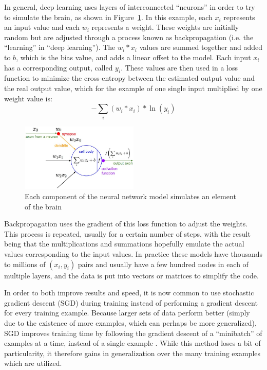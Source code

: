 \documentclass[]{report}
\begin{document}
In general, deep learning uses layers of interconnected ``neurons'' in order to try to simulate the brain, as shown in Figure~\ref{neural-model}. In this example, each $x_{i}$ represents an input value and each $w_{i}$ represents a weight. These weights are initially random but are adjusted through a process known as backpropagation (i.e. the ``learning'' in ``deep learning''). The $w_{i}*x_{i}$ values are summed together and added to $b$, which is the bias value, and adds a linear offset to the model. Each input $x_{i}$ has a corresponding output, called $y_{i}$. These values are then used in a loss function to minimize the cross-entropy between the estimated output value and the real output value, which for the example of one single input multiplied by one weight value is: $$-\sum_{i} (w_{i}*x_{i})*\ln(y_{i}) $$
\begin{figure}
	\centering
	\includegraphics[width=0.5\textwidth]{../images/neuron_model}
	\caption{Each component of the neural network model simulates an element of the brain \cite{karpathy}}
	\label{neural-model}
\end{figure}

Backpropagation uses the gradient of this loss function to adjust the weights. This process is repeated, usually for a certain number of steps, with the result being that the multiplications and summations hopefully emulate the actual values corresponding to the input values. In practice these models have thousands to millions of $(x_{i}, y_{i})$ pairs and usually have a few hundred nodes in each of multiple layers, and the data is put into vectors or matrices to simplify the code. 

In order to both improve results and speed, it is now common to use stochastic gradient descent (SGD) during training instead of performing a gradient descent for every training example. Because larger sets of data perform better (simply due to the existence of more examples, which can perhaps be more generalized), SGD improves training time by following the gradient descent of a ``minibatch'' of examples at a time, instead of a single example \cite{Goodfellow-et-al-2016,ThreeGiants}. While this method loses a bit of particularity, it therefore gains in generalization over the many training examples which are utilized.
\end{document}
